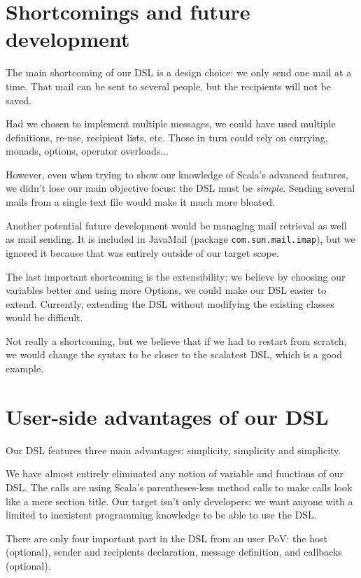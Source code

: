 \documentclass[10pt,a4paper]{article}
\begin{document}
\section{Shortcomings and future development}

	The main shortcoming of our DSL is a design choice: we only send one mail at a time. That mail can be sent to several people, but the recipients will not be saved.
	
	Had we chosen to implement multiple messages, we could have used multiple definitions, re-use, recipient lists, etc. Those in turn could rely on currying, monads, options, operator overloads...
	
	However, even when trying to show our knowledge of Scala's advanced features, we didn't lose our main objective focus: the DSL must be \textit{simple}. Sending several mails from a single text file would make it much more bloated.
	
	\vskip 10pt
	Another potential future development would be managing mail retrieval as well as mail sending. It is included in JavaMail (package \texttt{com.sun.mail.imap}), but we ignored it because that was entirely outside of our target scope.
	
	\vskip 10pt
	The last important shortcoming is the extensibility: we believe by choosing our variables better and using more Options, we could make our DSL easier to extend. Currently, extending the DSL without modifying the existing classes would be difficult.
	
	\vskip 10pt
	Not really a shortcoming, but we believe that if we had to restart from scratch, we would change the syntax to be closer to the scalatest DSL, which is a good example.

\section{User-side advantages of our DSL}

	Our DSL features three main advantages: simplicity, simplicity and simplicity.
	
	We have almost entirely eliminated any notion of variable and functions of our DSL. The calls are using Scala's parentheses-less method calls to make calls look like a mere section title. Our target isn't only developers: we want anyone with a limited to inexistent programming knowledge to be able to use the DSL.
	
	There are only four important part in the DSL from an user PoV: the host (optional), sender and recipients declaration, message definition, and callbacks (optional).
	
\end{document}
